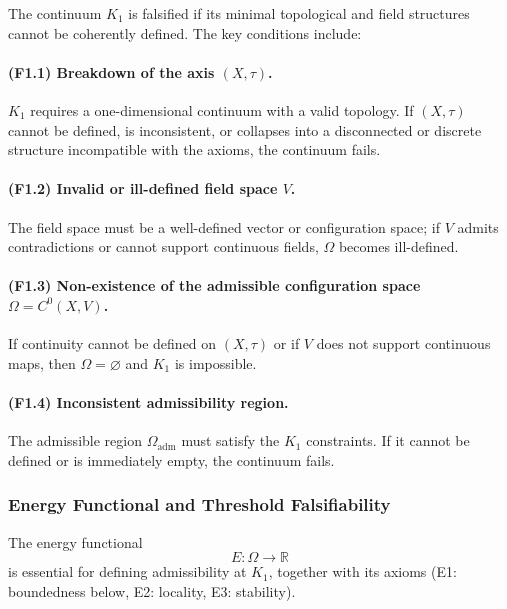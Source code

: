 The continuum $K_1$ is falsified if its minimal topological and field
structures cannot be coherently defined.
The key conditions include:

\paragraph{(F1.1) Breakdown of the axis \texorpdfstring{$(X,\tau)$}{(X,\tau)}.}
$K_1$ requires a one-dimensional continuum with a valid topology.
If $(X,\tau)$ cannot be defined, is inconsistent, or collapses into a
disconnected or discrete structure incompatible with the axioms, the
continuum fails.

\paragraph{(F1.2) Invalid or ill-defined field space \texorpdfstring{$V$}{V}.}
The field space must be a well-defined vector or configuration space;
if $V$ admits contradictions or cannot support continuous fields,
$\Omega$ becomes ill-defined.

\paragraph{(F1.3) Non-existence of the admissible configuration space \texorpdfstring{$\Omega=C^0(X,V)$}{\Omega=C^0(X,V)}.}
If continuity cannot be defined on $(X,\tau)$ or if $V$ does not support
continuous maps, then $\Omega=\varnothing$ and $K_1$ is impossible.

\paragraph{(F1.4) Inconsistent admissibility region.}
The admissible region $\Omega_{\mathrm{adm}}$ must satisfy the $K_1$
constraints.
If it cannot be defined or is immediately empty, the continuum fails.



\subsubsection{Energy Functional and Threshold Falsifiability}

The energy functional
\[
E : \Omega \to \mathbb{R}
\]
is essential for defining admissibility at $K_1$, together with its axioms
(E1: boundedness below, E2: locality, E3: stability).

